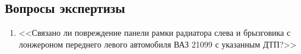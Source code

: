 \setcounter{page}{1}
%
%
\subsection{Вопросы экспертизы}
\begin{enumerate}
	\item  <<Связано ли повреждение панели рамки радиатора слева и брызговика с лонжероном переднего левого автомобиля ВАЗ 21099 с указанным ДТП?>>	
\end{enumerate}

%

